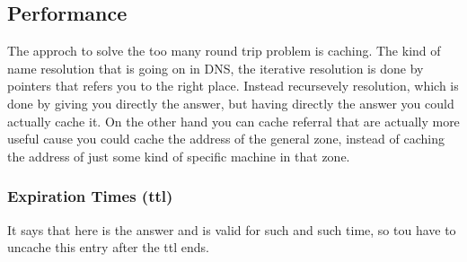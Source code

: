 \documentclass{article}
\begin{document}
    \subsection{Performance}
      The approch to solve the too many round trip problem is caching. The kind of name resolution
      that is going on in DNS, the iterative resolution is done by pointers that refers you to
      the right place. Instead recursevely resolution, which is done by giving you directly 
      the answer, but having directly the answer you could actually cache it. On the other
      hand you can cache referral that are actually more useful cause you could cache the 
      address of the general zone, instead of caching the address of just some kind of specific
      machine in that zone.
      \subsubsection{Expiration Times (ttl)} It says that here is the answer and is valid for
        such and such time, so tou have to uncache this entry after the ttl ends.
\end{document}

